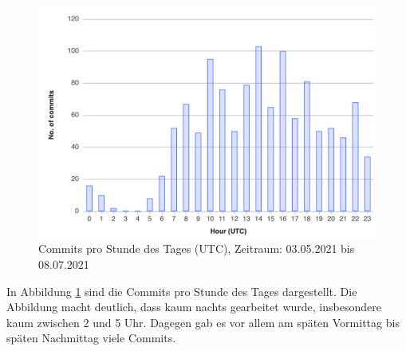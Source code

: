 \documentclass[../review_3.tex]{subfiles}
\begin{document}
\begin{figure} [h]
    \centering
    \includegraphics[width =0.65\linewidth]{img/gitlab4.png}
    \caption{Commits pro Stunde des Tages (UTC), Zeitraum: 03.05.2021 bis 08.07.2021}
    \label{gitlab4}
\end{figure}
In Abbildung \ref{gitlab4} sind die Commits pro Stunde des Tages dargestellt. Die Abbildung macht deutlich, dass kaum nachts gearbeitet wurde, insbesondere kaum zwischen 2 und 5 Uhr. Dagegen gab es vor allem am späten Vormittag bis späten Nachmittag viele Commits.
\end{document}

